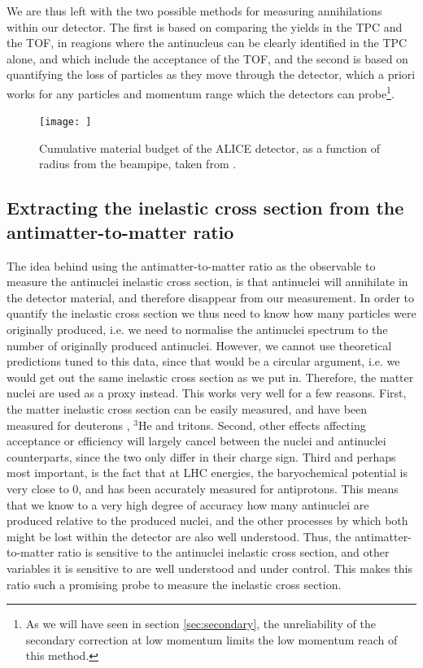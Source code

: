 We are thus left with the two possible methods for measuring annihilations within our detector. The first is based on comparing the yields in the TPC and the TOF, in reagions where the antinucleus can be clearly identified in the TPC alone, and which include the acceptance of the TOF, and the second is based on quantifying the loss of particles as they move through the detector, which a priori works for any particles and momentum range which the detectors can probe\footnote{As we will have seen in section \ref{sec:secondary}, the unreliability of the secondary correction at low momentum limits the low momentum reach of this method.}.

\begin{figure}[bhtp]
		\centering
		\texttt{[image: ]}
		\caption{Cumulative material budget of the ALICE detector, as a function of radius from the beampipe, taken from \cite{}.}
		\label{fig:ALICE_detector_material_budget}
\end{figure}

\subsection{Extracting the inelastic cross section from the antimatter-to-matter ratio}
The idea behind using the antimatter-to-matter ratio as the observable to measure the antinuclei inelastic cross section, is that antinuclei will annihilate in the detector material, and therefore disappear from our measurement. In order to quantify the inelastic cross section we thus need to know how many particles were originally produced, i.e. we need to normalise the antinuclei spectrum to the number of originally produced antinuclei. However, we cannot use theoretical predictions tuned to this data, since that would be a circular argument, i.e. we would get out the same inelastic cross section as we put in. Therefore, the matter nuclei are used as a proxy instead. This works very well for a few reasons. First, the matter inelastic cross section can be easily measured, and have been measured for deuterons \cite{}, $^3\mathrm{He}$\cite{} and tritons\cite{}. Second, other effects affecting acceptance or efficiency will largely cancel between the nuclei and antinuclei counterparts, since the two only differ in their charge sign. Third and perhaps most important, is the fact that at LHC energies, the baryochemical potential is very close to 0, and has been accurately measured for antiprotons. This means that we know to a very high degree of accuracy how many antinuclei are produced relative to the produced nuclei, and the other processes by which both might be lost within the detector are also well understood. Thus, the antimatter-to-matter ratio is sensitive to the antinuclei inelastic cross section, and other variables it is sensitive to are well understood and under control. This makes this ratio such a promising probe to measure the inelastic cross section.\\

